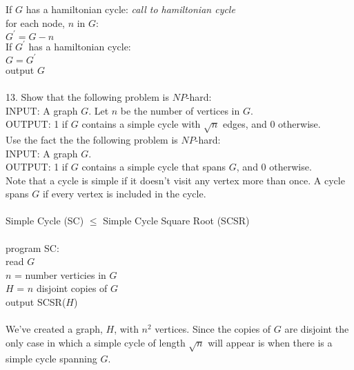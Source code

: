 \documentclass[10pt]{article}
\newcommand{\tab}{\hspace*{2em}}
\newcommand{\tabb}{\hspace*{4em}}
\newcommand{\tabbb}{\hspace*{6em}}
\newcommand{\tabbbb}{\hspace*{8em}}
\begin{document}
		\tab If $G$ has a hamiltonian cycle: \emph{call to hamiltonian cycle}\\ 
		\tabb for each node, $n$ in $G$:\\
		\tabbb $G^\prime = G - n$\\
		\tabbb If $G^\prime$ has a hamiltonian cycle:\\
		\tabbbb $G = G^\prime$\\
		\tab output $G$
		\\
		\\
		13. Show that the following problem is $NP$-hard:\\
		INPUT: A graph $G$. Let $n$ be the number of vertices in $G$.\\
		OUTPUT: 1 if $G$ contains a simple cycle with $\sqrt{n}$ edges, and 0 otherwise.\\
		Use the fact the the following problem is $NP$-hard:\\
		INPUT: A graph $G$.\\
		OUTPUT: 1 if $G$ contains a simple cycle that spans $G$, and 0 otherwise.\\
		Note that a cycle is simple if it doesn’t visit any vertex more than once. A cycle spans $G$ if every
		vertex is included in the cycle.\\
		\\
		Simple Cycle (SC) $\leq$ Simple Cycle Square Root (SCSR)\\
		\\
		program SC:\\
		\tab read $G$\\
		\tab $n$ = number verticies in $G$\\
		\tab $H$ = $n$ disjoint copies of $G$\\
		\tab output SCSR($H$)\\
		\\
		We've created a graph, $H$, with $n^2$ vertices. Since the copies of $G$ are disjoint the only case in which a simple cycle of 
		length $\sqrt{n}$ will appear is when there is a simple cycle spanning $G$.
\end{document}
